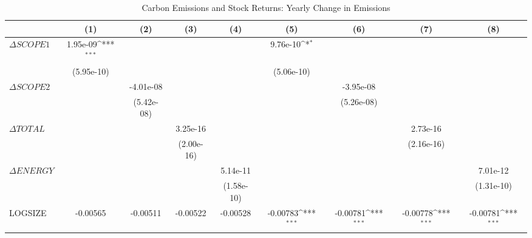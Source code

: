 \begin{table}[htbp]\centering
\def\sym#1{\ifmmode^{#1}\else\(^{#1}\)\fi}
\caption{Carbon Emissions and Stock Returns: Yearly Change in Emissions}
\begin{tabular}{l*{8}{c}}
\hline\hline
                    &\multicolumn{1}{c}{(1)}         &\multicolumn{1}{c}{(2)}         &\multicolumn{1}{c}{(3)}         &\multicolumn{1}{c}{(4)}         &\multicolumn{1}{c}{(5)}         &\multicolumn{1}{c}{(6)}         &\multicolumn{1}{c}{(7)}         &\multicolumn{1}{c}{(8)}         \\
\hline
$\Delta SCOPE1$     &    1.95e-09\sym{***}&                     &                     &                     &    9.76e-10\sym{*}  &                     &                     &                     \\
                    &  (5.95e-10)         &                     &                     &                     &  (5.06e-10)         &                     &                     &                     \\
$\Delta SCOPE2$     &                     &   -4.01e-08         &                     &                     &                     &   -3.95e-08         &                     &                     \\
                    &                     &  (5.42e-08)         &                     &                     &                     &  (5.26e-08)         &                     &                     \\
$\Delta TOTAL$      &                     &                     &    3.25e-16         &                     &                     &                     &    2.73e-16         &                     \\
                    &                     &                     &  (2.00e-16)         &                     &                     &                     &  (2.16e-16)         &                     \\
$\Delta ENERGY$     &                     &                     &                     &    5.14e-11         &                     &                     &                     &    7.01e-12         \\
                    &                     &                     &                     &  (1.58e-10)         &                     &                     &                     &  (1.31e-10)         \\
LOGSIZE             &    -0.00565         &    -0.00511         &    -0.00522         &    -0.00528         &    -0.00783\sym{***}&    -0.00781\sym{***}&    -0.00778\sym{***}&    -0.00781\sym{***}\\

\end{tabular}
\end{table}
